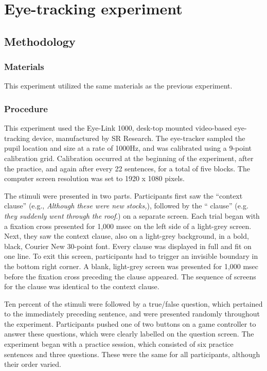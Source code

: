 \documentclass[output=paper
,modfonts
,nonflat]{langsci/langscibook}
\begin{document}



\section{Eye-tracking experiment}
\subsection{Methodology}

\subsubsection{Materials}
This experiment utilized the same materials as the previous experiment.


\subsubsection{Procedure}

This experiment used the Eye-Link 1000, desk-top mounted video-based eye-tracking device, manufactured by SR Research. The eye-tracker sampled the pupil location and size at a rate of 1000Hz, and was calibrated using a 9-point calibration grid. Calibration occurred at the beginning of the experiment, after the practice, and again after every 22 sentences, for a total of five blocks. The computer screen resolution was set to 1920 x 1080 pixels.

The stimuli were presented in two parts. Participants first saw the ``context clause'' (e.g., \textit{ Although these were new stocks,}), followed by the `` clause'' (e.g. \textit{they suddenly went through the roof}.) on a separate screen. Each trial began with a fixation cross presented for 1,000 msec on the left side of a light-grey screen. Next, they saw the context clause, also on a light-grey background, in a bold, black, Courier New 30-point font. Every clause was displayed in full and fit on one line. To exit this screen, participants had to trigger an invisible boundary in the bottom right corner. A blank, light-grey screen was presented for 1,000 msec before the fixation cross preceding the  clause appeared. The sequence of screens for the  clause was identical to the context clause.  

Ten percent of the stimuli were followed by a true/false  question, which pertained to the immediately preceding sentence, and were presented randomly throughout the experiment. Participants pushed one of two buttons on a game controller to answer these questions, which were clearly labelled on the question screen. The experiment began with a practice session, which consisted of six practice sentences and three questions. These were the same for all participants, although their order varied. 
\end{document}
